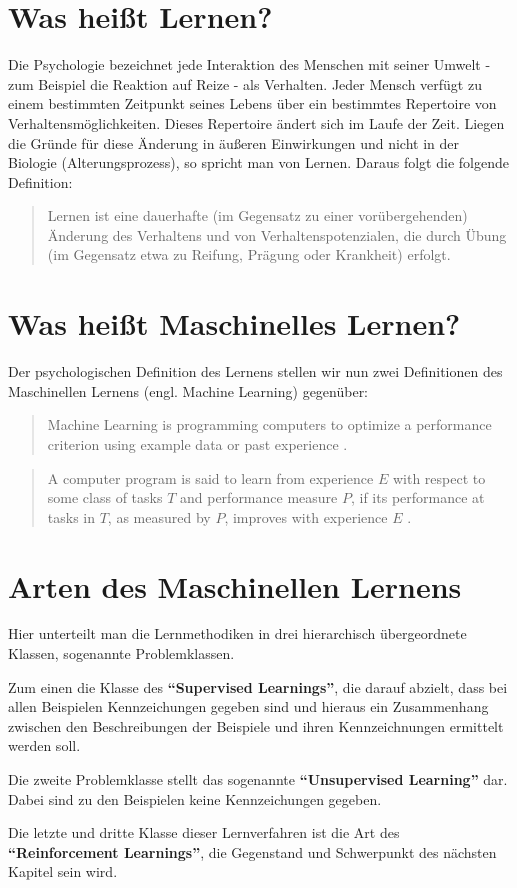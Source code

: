 \section{Was heißt Lernen?}
Die Psychologie bezeichnet jede Interaktion des Menschen mit seiner Umwelt - 
zum Beispiel die Reaktion auf Reize - als Verhalten. Jeder Mensch verfügt zu 
einem bestimmten Zeitpunkt seines Lebens über ein bestimmtes Repertoire von 
Verhaltensmöglichkeiten. Dieses Repertoire ändert sich im Laufe der Zeit. 
Liegen die Gründe für diese Änderung in äußeren Einwirkungen und nicht in der 
Biologie (Alterungsprozess), so spricht man von Lernen. Daraus folgt die 
folgende Definition:

\begin{quotation}
Lernen ist eine dauerhafte (im Gegensatz zu einer vorübergehenden) Änderung
des Verhaltens und von Verhaltenspotenzialen, die durch Übung (im Gegensatz etwa
zu Reifung, Prägung oder Krankheit) erfolgt.
\end{quotation}

\section{Was heißt Maschinelles Lernen?}
Der psychologischen Definition des Lernens stellen wir nun zwei Definitionen
des Maschinellen Lernens (engl. Machine Learning) gegenüber:

\begin{quotation}
Machine Learning is programming computers to optimize a performance
criterion using example data or past experience \cite{Alpaydin2004}.
\end{quotation}

\begin{quotation}
A computer program is said to learn from experience $E$ with respect to some 
class of tasks $T$ and performance measure $P$, if its performance at tasks in 
$T$, as measured by $P$, improves with experience $E$ \cite{Mitchell1997}.
\end{quotation}

\section{Arten des Maschinellen Lernens}
Hier unterteilt man die Lernmethodiken in drei hierarchisch übergeordnete
Klassen, sogenannte Problemklassen. 
\par Zum einen die Klasse des \textbf{"`Supervised Learnings"'}, die darauf
abzielt, dass bei allen Beispielen Kennzeichungen gegeben sind und hieraus ein 
Zusammenhang zwischen den Beschreibungen der Beispiele und ihren Kennzeichnungen
ermittelt werden soll. \par Die zweite Problemklasse stellt das sogenannte
\textbf{"`Unsupervised Learning"'} dar. Dabei sind zu den Beispielen keine Kennzeichungen gegeben. 
\par Die letzte und dritte Klasse dieser Lernverfahren ist die Art des
\textbf{"`Reinforcement Learnings"'}, die Gegenstand und Schwerpunkt des
nächsten Kapitel sein wird.